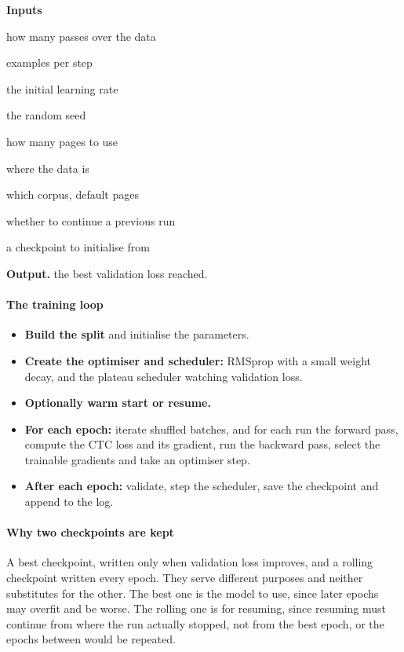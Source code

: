 \noindent\textbf{Inputs}
\begin{description}[leftmargin=2.2em,style=nextline,font=\normalfont\ttfamily]\setlength\itemsep{1pt}
  \item[{numEpochs}] \normalfont how many passes over the data
  \item[{batchSize}] \normalfont examples per step
  \item[{lr}] \normalfont the initial learning rate
  \item[{seed}] \normalfont the random seed
  \item[{maxPages}] \normalfont how many pages to use
  \item[{dataDir}] \normalfont where the data is
  \item[{source}] \normalfont which corpus, default pages
  \item[{resume}] \normalfont whether to continue a previous run
  \item[{warmStart}] \normalfont a checkpoint to initialise from
\end{description}

\noindent\textbf{Output.} the best validation loss reached.


\paragraph{The training loop}

\begin{itemize}\setlength\itemsep{0pt}
  \item \textbf{Build the split} and initialise the parameters.
  \item \textbf{Create the optimiser and scheduler:} RMSprop with a small weight decay, and the plateau scheduler watching validation loss.
  \item \textbf{Optionally warm start or resume.}
  \item \textbf{For each epoch:} iterate shuffled batches, and for each run the forward pass, compute the CTC loss and its gradient, run the backward pass, select the trainable gradients and take an optimiser step.
  \item \textbf{After each epoch:} validate, step the scheduler, save the checkpoint and append to the log.
\end{itemize}

\paragraph{Why two checkpoints are kept}
A best checkpoint, written only when validation loss improves, and a rolling checkpoint written every epoch. They serve different purposes and neither substitutes for the other. The best one is the model to use, since later epochs may overfit and be worse. The rolling one is for resuming, since resuming must continue from where the run actually stopped, not from the best epoch, or the epochs between would be repeated.


